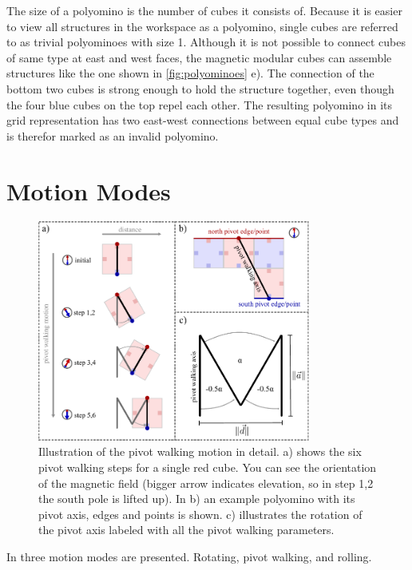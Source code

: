 The size of a polyomino is the number of cubes it consists of.
Because it is easier to view all structures in the workspace as a polyomino, single cubes are referred to as trivial polyominoes with size 1.
Although it is not possible to connect cubes of same type at east and west faces, the magnetic modular cubes can assemble structures like the one shown in \autoref{fig:polyominoes} e).
The connection of the bottom two cubes is strong enough to hold the structure together, even though the four blue cubes on the top repel each other.
The resulting polyomino in its grid representation has two east-west connections between equal cube types and is therefor marked as an invalid polyomino.



\section{Motion Modes}
\label{sec:motion}

\begin{figure}
	\centering
	\includegraphics[width=0.80\textwidth]{figures/pivot_walking.pdf}
	\caption[Illustration of the pivot walking motion]{Illustration of the pivot walking motion in detail. a) shows the six pivot walking steps for a single red cube. You can see the orientation of the magnetic field (bigger arrow indicates elevation, so in step 1,2 the south pole is lifted up). In b) an example polyomino with its pivot axis, edges and points is shown. c) illustrates the rotation of the pivot axis labeled with all the pivot walking parameters.}
	\label{fig:pivot_walking}
\end{figure}

In \cite{Bhattacharjee2022} three motion modes are presented. Rotating, pivot walking, and rolling.

